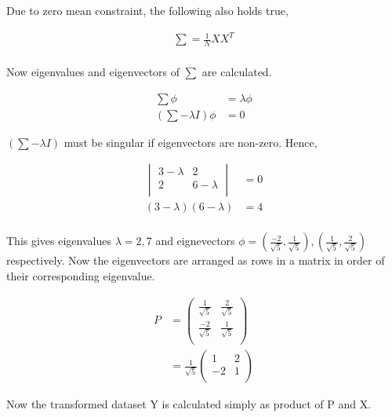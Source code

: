 \documentclass[11pt, a4paper]{article}
\begin{document}
Due to zero mean constraint, the following also holds true,

\begin{align*}
	\sum = \frac{1}{N} XX^T \\
\end{align*}

Now eigenvalues and eigenvectors of $\sum$ are calculated.

\begin{align*}
	\sum \phi              & = \lambda \phi \\
	(\sum - \lambda I)\phi & = 0            
\end{align*}

$(\sum - \lambda I)$ must be singular if eigenvectors are non-zero. Hence,

\begin{align*}
	\begin{vmatrix} 3 - \lambda & 2           \\
	2                           & 6 - \lambda \\ 
	\end{vmatrix}               & = 0         \\
	(3 - \lambda)(6 - \lambda)  & = 4         \\	                
\end{align*}

This gives eigenvalues $\lambda = 2, 7$ and eignevectors $\phi = (\frac{-2}{\sqrt{5}}, \frac{1}{\sqrt{5}}), (\frac{1}{\sqrt{5}}, \frac{2}{\sqrt{5}}) $ respectively. Now the eigenvectors are arranged as rows in a matrix in order of their corresponding eigenvalue. 


\begin{align*}
	P & = \begin{pmatrix} \frac{1}{\sqrt{5}}   & \frac{2}{\sqrt{5}} \\
	\frac{-2}{\sqrt{5}} & \frac{1}{\sqrt{5}} \\ 
	\end{pmatrix}  \\
	  & = \frac{1}{\sqrt{5}} \begin{pmatrix} 1 & 2                  \\
	-2 & 1\\ 
	\end{pmatrix}	                
\end{align*}

Now the transformed dataset Y is calculated simply as product of P and X.
\end{document}
